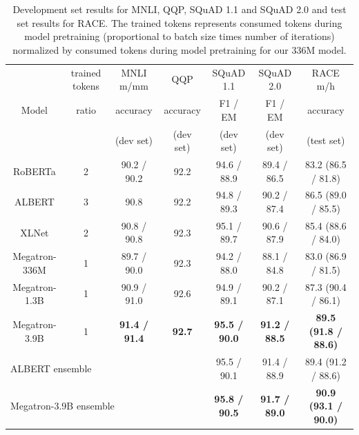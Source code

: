 \documentclass{article}
\begin{document}
\begin{table}
\footnotesize
\begin{center}
\caption{Development set results for MNLI, QQP, SQuAD 1.1 and SQuAD 2.0 and test set results for RACE. The trained tokens represents consumed tokens during model pretraining (proportional to batch size times number of iterations) normalized by consumed tokens during model pretraining for our 336M model.}
\label{tab:bert_results}
\begin{tabular}{c|c|c|c|c|c||c} \hline \hline
\multirow{3}{*}{Model}         & trained tokens & MNLI m/mm         & QQP       & SQuAD 1.1         & SQuAD 2.0        & RACE m/h         \\
              & ratio        & accuracy         & accuracy  & F1 / EM            & F1 / EM          & accuracy         \\
                  &        & (dev set)         & (dev set)  & (dev set)           & (dev set)          & (test set)         \\\hline
RoBERTa \cite{roberta}       & 2              & 90.2 / 90.2      & 92.2      & 94.6 / 88.9        & 89.4 / 86.5      & 83.2 (86.5 / 81.8)      \\
ALBERT \cite{ALBERT2019}        & 3              & 90.8             & 92.2      & 94.8 / 89.3        & 90.2 / 87.4      & 86.5 (89.0 / 85.5)      \\
XLNet \cite{xlnet}       & 2              & 90.8 / 90.8      & 92.3      & 95.1 / 89.7   & 90.6 / 87.9      & 85.4 (88.6 / 84.0)      \\
Megatron-336M & 1              & 89.7 / 90.0      & 92.3      & 94.2 / 88.0        & 88.1 / 84.8      & 83.0 (86.9 / 81.5)      \\
Megatron-1.3B & 1              & 90.9 / 91.0      & 92.6      & 94.9 / 89.1        & 90.2 / 87.1      & 87.3 (90.4 / 86.1)      \\
Megatron-3.9B & 1           & \bf{91.4 / 91.4} & \bf{92.7} & \bf{95.5 / 90.0} & \bf{91.2 / 88.5} & \bf{89.5 (91.8 / 88.6)} \\\hline
 \multicolumn{3}{l}{ALBERT ensemble \cite{ALBERT2019} } & & 95.5 / 90.1 &91.4 / 88.9 & 89.4 (91.2 / 88.6)\\
  \multicolumn{3}{l}{Megatron-3.9B ensemble} &  &  \bf{95.8 / 90.5} & \bf{91.7 / 89.0} & \bf{90.9 (93.1 / 90.0)}\\\hline 
\end{tabular}
\end{center}
\end{table}
\end{document}
